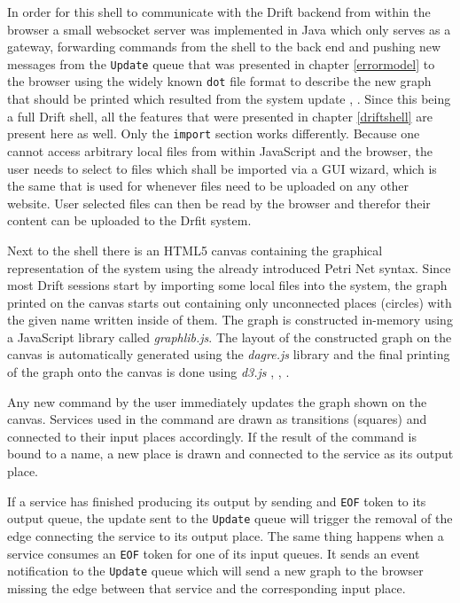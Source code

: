 In order for this shell to communicate with the Drift backend
from within the browser a small websocket server was implemented
in Java which only serves as a gateway, forwarding commands from
the shell to the back end and pushing new messages from the
\texttt{Update} queue that was presented in
chapter \ref{errormodel} to the browser using the widely known
\texttt{dot} file format to describe the new graph that should
be printed which resulted from the system update \cite{dotlang},
\cite{dotwiki}.
Since this being a full Drift shell, all the features that were
presented in chapter \ref{driftshell} are present here as well.
Only the \texttt{import} section works differently. Because
one cannot access arbitrary local files from within JavaScript
and the browser, the user needs to select to files which shall
be imported via a GUI wizard, which is the same that is used
for whenever files need to be uploaded on any other website.
User selected files can then be read by the browser and therefor
their content can be uploaded to the Drfit system.
\newline

Next to the shell there is an HTML5 canvas containing the graphical
representation of the system using the already introduced Petri Net syntax.
Since most Drift sessions start by importing some local files into the
system, the graph printed on the canvas starts out containing
only unconnected places (circles) with the given name written inside
of them.
The graph is constructed in-memory using a JavaScript library called
\textit{graphlib.js}. The layout of the constructed graph on the
canvas is automatically generated using the \textit{dagre.js}
library and the final printing of the graph onto the canvas is
done using \textit{d3.js} \cite{graphlibjs}, \cite{dagrejs},
\cite{d3js}.

Any new command by the user immediately updates the graph shown
on the canvas. Services used in the command are drawn as transitions
(squares) and connected to their input places accordingly.
If the result of the command is bound to a name, a new place is
drawn and connected to the service as its output place.

If a service has finished producing its output by sending and
\texttt{EOF} token to its output queue, the update sent to the
\texttt{Update} queue will trigger the removal of the edge
connecting the service to its output place. The same thing
happens when a service consumes an \texttt{EOF} token for one
of its input queues. It sends an event notification to the
\texttt{Update} queue which will send a new graph to the
browser missing the edge between that service and the
corresponding input place.

